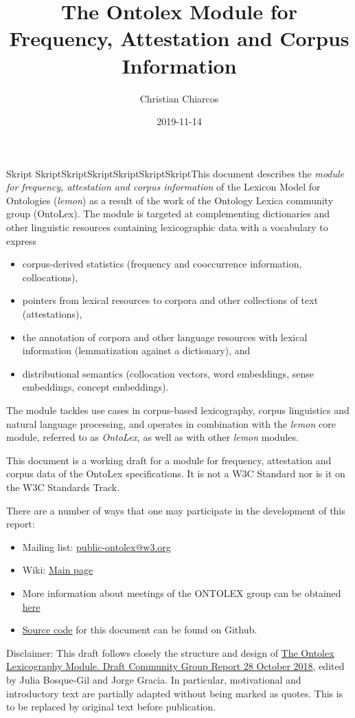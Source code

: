 \documentclass[a4paper]{article}
\title{The Ontolex Module for Frequency, Attestation and Corpus Information}
\author{Christian Chiarcos}
\date{2019-11-14}
\newcommand\textstyleEmphasis[1]{\textit{#1}}
\newcommand\textstyleInternetlink[1]{\textcolor[rgb]{0.0,0.0,0.5019608}{#1}}
\newcommand\liststyleWWNumi{%
\renewcommand\labelitemi{[F0B7?]}
\renewcommand\labelitemii{[F0B7?]}
\renewcommand\labelitemiii{[F0B7?]}
\renewcommand\labelitemiv{[F0B7?]}
}
\newcommand\liststyleWWNumii{%
\renewcommand\labelitemi{[F0B7?]}
\renewcommand\labelitemii{[F0B7?]}
\renewcommand\labelitemiii{[F0B7?]}
\renewcommand\labelitemiv{[F0B7?]}
}
\begin{document}
\clearpage\setcounter{page}{1}\pagestyle{Standard}

%
%
%
Skript%
%
%
SkriptSkriptSkriptSkriptSkriptSkriptThis document describes the \textstyleEmphasis{module for frequency, attestation and corpus information} of the Lexicon Model for Ontologies (\textstyleEmphasis{lemon}) as a result of the work of the Ontology Lexica community group (OntoLex). The module is targeted at complementing dictionaries and other linguistic resources containing lexicographic data with a vocabulary to express

\liststyleWWNumi
\begin{itemize}
\item corpus-derived statistics (frequency and cooccurrence information, collocations), 
\item pointers from lexical resources to corpora and other collections of text (attestations), 
\item the annotation of corpora and other language resources with lexical information (lemmatization against a dictionary), and 
\item distributional semantics (collocation vectors, word embeddings, sense embeddings, concept embeddings). 
\end{itemize}
The module tackles use cases in corpus-based lexicography, corpus linguistics and natural language processing, and operates in combination with the \textstyleEmphasis{lemon} core module, referred to as \textstyleEmphasis{OntoLex}, as well as with other \textstyleEmphasis{lemon} modules. 

This document is a working draft for a module for frequency, attestation and corpus data of the OntoLex specifications. It is not a W3C Standard nor is it on the W3C Standards Track.

There are a number of ways that one may participate in the development of this report:

\liststyleWWNumii
\begin{itemize}
\item Mailing list: \href{http://lists.w3.org/Archives/Public/public-ontolex/}{\textstyleInternetlink{public-ontolex@w3.org}} 
\item Wiki: \href{https://www.w3.org/community/ontolex/wiki/Main_Page}{\textstyleInternetlink{Main page}} 
\item More information about meetings of the ONTOLEX group can be obtained \href{https://www.w3.org/community/ontolex/wiki/Main_Page#Meetings}{\textstyleInternetlink{here}} 
\item \href{https://github.com/acoli-repo/ontolex-frac}{\textstyleInternetlink{Source code}} for this document can be found on Github. 
\end{itemize}
Disclaimer: This draft follows closely the structure and design of \href{https://jogracia.github.io/ontolex-lexicog/}{\textstyleInternetlink{The Ontolex Lexicography Module. Draft Community Group Report 28 October 2018}}, edited by Julia Bosque-Gil and Jorge Gracia. In particular, motivational and introductory text are partially adapted without being marked as quotes. This is to be replaced by original text before publication. 
\end{document}
